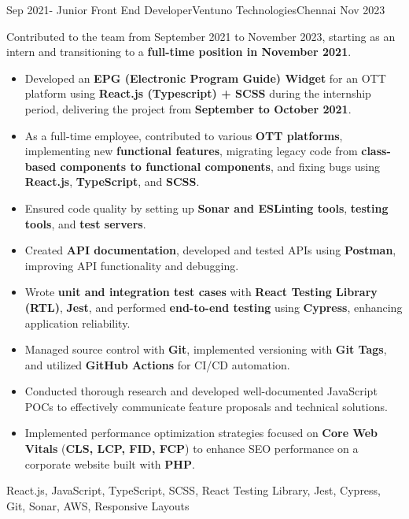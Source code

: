 \begin{experiences}
  \emptySeparator
  \experience
    {Sep 2021-} {Junior Front End Developer}{Ventuno Technologies}{Chennai}
    {Nov 2023} {
        \par Contributed to the team from September 2021 to November 2023, starting as an intern and transitioning to a \textbf{full-time position in November 2021}.
        \begin{itemize}
            \item Developed an \textbf{EPG (Electronic Program Guide) Widget} for an OTT platform using \textbf{React.js (Typescript) + SCSS} during the internship period, delivering the project from \textbf{September to October 2021}.
            \item As a full-time employee, contributed to various \textbf{OTT platforms}, implementing new \textbf{functional features}, migrating legacy code from \textbf{class-based components to functional components}, and fixing bugs using \textbf{React.js}, \textbf{TypeScript}, and \textbf{SCSS}.
            \item Ensured code quality by setting up \textbf{Sonar and ESLinting tools}, \textbf{testing tools}, and \textbf{test servers}.
            \item Created \textbf{API documentation}, developed and tested APIs using \textbf{Postman}, improving API functionality and debugging.
            \item Wrote \textbf{unit and integration test cases} with \textbf{React Testing Library (RTL)}, \textbf{Jest}, and performed \textbf{end-to-end testing} using \textbf{Cypress}, enhancing application reliability.
            \item Managed source control with \textbf{Git}, implemented versioning with \textbf{Git Tags}, and utilized \textbf{GitHub Actions} for CI/CD automation.
            \item Conducted thorough research and developed well-documented JavaScript POCs to effectively communicate feature proposals and technical solutions.
            \item Implemented performance optimization strategies focused on \textbf{Core Web Vitals} (\textbf{CLS, LCP, FID, FCP}) to enhance SEO performance on a corporate website built with \textbf{PHP}.
        \end{itemize}
    }
    {React.js, JavaScript, TypeScript, SCSS, React Testing Library, Jest, Cypress, Git, Sonar, AWS, Responsive Layouts}


\end{experiences}
